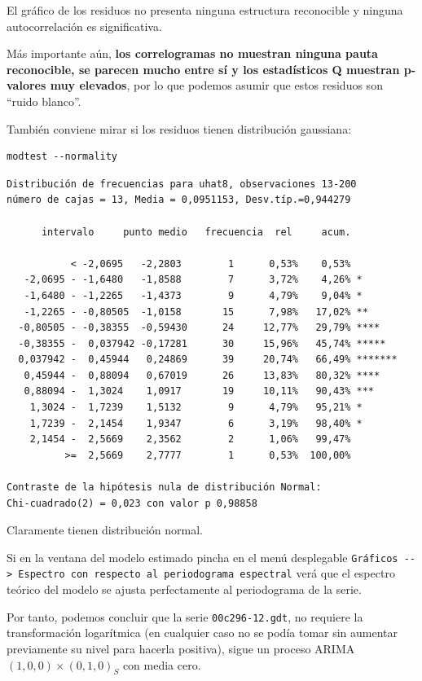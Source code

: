 \documentclass[10pt]{article}
\begin{document}
El gráfico de los residuos no presenta ninguna estructura reconocible
y ninguna autocorrelación es significativa.

Más importante aún, \textbf{los correlogramas no muestran ninguna pauta
reconocible, se parecen mucho entre sí y los estadísticos Q muestran
p-valores muy elevados}, por lo que podemos asumir que estos residuos
son ``ruido blanco''.
\medskip

También conviene mirar si los residuos tienen distribución gaussiana:
\medskip

\begin{verbatim}
modtest --normality
\end{verbatim}

\begin{verbatim}
Distribución de frecuencias para uhat8, observaciones 13-200
número de cajas = 13, Media = 0,0951153, Desv.típ.=0,944279

      intervalo     punto medio   frecuencia  rel     acum.

           < -2,0695   -2,2803        1      0,53%    0,53% 
   -2,0695 - -1,6480   -1,8588        7      3,72%    4,26% *
   -1,6480 - -1,2265   -1,4373        9      4,79%    9,04% *
   -1,2265 - -0,80505  -1,0158       15      7,98%   17,02% **
  -0,80505 - -0,38355  -0,59430      24     12,77%   29,79% ****
  -0,38355 -  0,037942 -0,17281      30     15,96%   45,74% *****
  0,037942 -  0,45944   0,24869      39     20,74%   66,49% *******
   0,45944 -  0,88094   0,67019      26     13,83%   80,32% ****
   0,88094 -  1,3024    1,0917       19     10,11%   90,43% ***
    1,3024 -  1,7239    1,5132        9      4,79%   95,21% *
    1,7239 -  2,1454    1,9347        6      3,19%   98,40% *
    2,1454 -  2,5669    2,3562        2      1,06%   99,47% 
          >=  2,5669    2,7777        1      0,53%  100,00% 

Contraste de la hipótesis nula de distribución Normal:
Chi-cuadrado(2) = 0,023 con valor p 0,98858
\end{verbatim}

Claramente tienen distribución normal.


Si en la ventana del modelo estimado pincha en el menú
desplegable \texttt{Gráficos -{}-{}> Espectro con respecto al periodograma
espectral} verá que el espectro teórico del modelo se ajusta
perfectamente al periodograma de la serie.
\medskip

Por tanto, podemos concluir que la serie \texttt{00c296-12.gdt}, no requiere
la transformación logarítmica (en cualquier caso no se podía tomar sin
aumentar previamente su nivel para hacerla positiva), sigue un proceso
ARIMA\((1,0,0)\times(0,1,0)_S\) con media cero.
\end{document}
